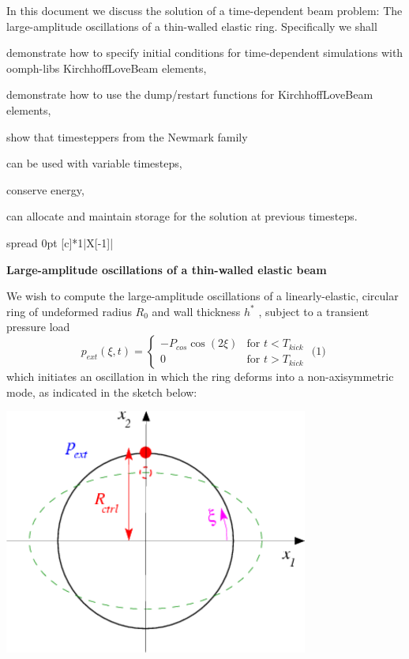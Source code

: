 In this document we discuss the solution of a time-\/dependent beam problem\+: The large-\/amplitude oscillations of a thin-\/walled elastic ring. Specifically we shall
\begin{DoxyItemize}
\item demonstrate how to specify initial conditions for time-\/dependent simulations with {\ttfamily oomph-\/lib\textquotesingle{}s} {\ttfamily Kirchhoff\+Love\+Beam} elements,
\item demonstrate how to use the {\ttfamily dump/restart} functions for {\ttfamily Kirchhoff\+Love\+Beam} elements,
\item show that timesteppers from the {\ttfamily Newmark} family
\begin{DoxyItemize}
\item can be used with variable timesteps,
\item conserve energy,
\item can allocate and maintain storage for the solution at previous timesteps.
\end{DoxyItemize}
\end{DoxyItemize}\begin{center} \tabulinesep=1mm
\begin{longtabu} spread 0pt [c]{*{1}{|X[-1]}|}
\hline
\begin{center} {\bfseries Large-\/amplitude oscillations of a thin-\/walled elastic beam} \end{center} 

We wish to compute the large-\/amplitude oscillations of a linearly-\/elastic, circular ring of undeformed radius $ R_0 $ and wall thickness $ h^* $ , subject to a transient pressure load \[ p_{ext}\left(\xi ,t \right) = \left\{ \begin{array}{ll} -P_{cos}\cos\left(2\xi\right) & \mbox{for $t<T_{kick}$} \\ 0 & \mbox{for $t>T_{kick}$} \end{array} \right. \mbox{\ \ \ \ \ \ \ \ \ \ (1) } \] which initiates an oscillation in which the ring deforms into a non-\/axisymmetric mode, as indicated in the sketch below\+:

 
\begin{DoxyImage}
\includegraphics[width=0.75\textwidth]{ring_sketch}
\end{DoxyImage}



\end{longtabu}
\end{center}
